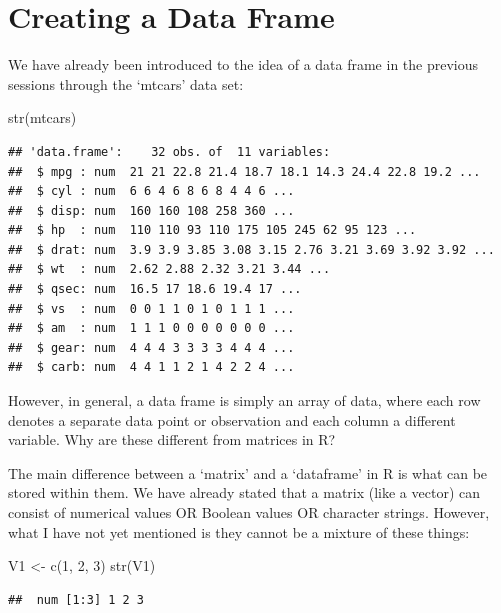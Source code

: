 \documentclass[
]{book}
\newenvironment{Shaded}{\begin{snugshade}}{\end{snugshade}}
\newcommand{\DecValTok}[1]{\textcolor[rgb]{0.00,0.00,0.81}{#1}}
\newcommand{\FunctionTok}[1]{\textcolor[rgb]{0.00,0.00,0.00}{#1}}
\newcommand{\NormalTok}[1]{#1}
\newcommand{\OtherTok}[1]{\textcolor[rgb]{0.56,0.35,0.01}{#1}}
\theoremstyle{definition}
\theoremstyle{definition}
\theoremstyle{definition}
\theoremstyle{definition}
\theoremstyle{remark}
\begin{document}
\hypertarget{creating-a-data-frame}{%
\section{Creating a Data Frame}\label{creating-a-data-frame}}

We have already been introduced to the idea of a data frame in the previous sessions through the `mtcars' data set:

\begin{Shaded}
\begin{Highlighting}[]
\FunctionTok{str}\NormalTok{(mtcars)}
\end{Highlighting}
\end{Shaded}

\begin{verbatim}
## 'data.frame':    32 obs. of  11 variables:
##  $ mpg : num  21 21 22.8 21.4 18.7 18.1 14.3 24.4 22.8 19.2 ...
##  $ cyl : num  6 6 4 6 8 6 8 4 4 6 ...
##  $ disp: num  160 160 108 258 360 ...
##  $ hp  : num  110 110 93 110 175 105 245 62 95 123 ...
##  $ drat: num  3.9 3.9 3.85 3.08 3.15 2.76 3.21 3.69 3.92 3.92 ...
##  $ wt  : num  2.62 2.88 2.32 3.21 3.44 ...
##  $ qsec: num  16.5 17 18.6 19.4 17 ...
##  $ vs  : num  0 0 1 1 0 1 0 1 1 1 ...
##  $ am  : num  1 1 1 0 0 0 0 0 0 0 ...
##  $ gear: num  4 4 4 3 3 3 3 4 4 4 ...
##  $ carb: num  4 4 1 1 2 1 4 2 2 4 ...
\end{verbatim}

However, in general, a data frame is simply an array of data, where each row denotes a separate data point or observation and each column a different variable. Why are these different from matrices in R?

The main difference between a `matrix' and a `dataframe' in R is what can be stored within them. We have already stated that a matrix (like a vector) can consist of numerical values OR Boolean values OR character strings. However, what I have not yet mentioned is they cannot be a mixture of these things:

\begin{Shaded}
\begin{Highlighting}[]
\NormalTok{V1 }\OtherTok{\textless{}{-}} \FunctionTok{c}\NormalTok{(}\DecValTok{1}\NormalTok{, }\DecValTok{2}\NormalTok{, }\DecValTok{3}\NormalTok{)}
\FunctionTok{str}\NormalTok{(V1)}
\end{Highlighting}
\end{Shaded}

\begin{verbatim}
##  num [1:3] 1 2 3
\end{verbatim}
\end{document}
